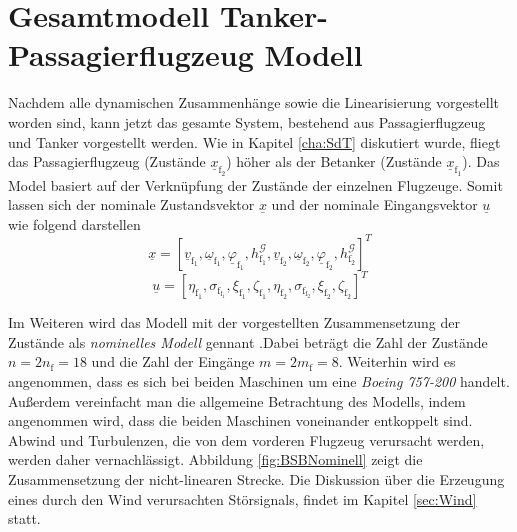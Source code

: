 \chapter{Gesamtmodell Tanker-Passagierflugzeug Modell}\label{cha:ZweiFlieger}
Nachdem alle dynamischen Zusammenhänge sowie die Linearisierung vorgestellt worden sind, kann jetzt das gesamte System, bestehend aus Passagierflugzeug und Tanker vorgestellt werden. Wie in Kapitel \ref{cha:SdT} diskutiert wurde, fliegt das Passagierflugzeug (Zustände $\underline{x}_\mathrm{f_2}$) höher als der Betanker (Zustände $\underline{x}_\mathrm{f_1}$). Das Model basiert auf der Verknüpfung der Zustände der einzelnen Flugzeuge. Somit lassen sich der nominale Zustandsvektor $\underline{x}$ und der nominale Eingangsvektor $\underline{u}$ wie folgend darstellen
\begin{equation}
\underline{x} = [
\underline{v}_\mathrm{f_1},\underline{\omega}_\mathrm{f_1},\underline{\varphi}_\mathrm{f_1},h^\mathcal{G}_\mathrm{f_1},
\underline{v}_\mathrm{f_2},\underline{\omega}_\mathrm{f_2},\underline{\varphi}_\mathrm{f_2},h^\mathcal{G}_\mathrm{f_2}]^T
\end{equation}
\begin{equation}
\underline{u} = [ \eta_\mathrm{f_1},\sigma_{\mathrm{f_{f_1}}}, \xi_\mathrm{f_1} , \zeta_\mathrm{f_1}, \eta_\mathrm{f_2},\sigma_{\mathrm{f_{f_2}}}, \xi_\mathrm{f_2} , \zeta_\mathrm{f_2}]^T
\end{equation}

Im Weiteren wird das Modell mit der vorgestellten Zusammensetzung der Zustände als \textit{nominelles Modell} gennant .Dabei beträgt die Zahl der Zustände $n = 2n_\mathrm{f} = 18$ und die Zahl der Eingänge $m = 2m_\mathrm{f} = 8$. Weiterhin wird es angenommen, dass es sich bei beiden Maschinen um eine \textit{Boeing 757-200} handelt. Au{\ss}erdem vereinfacht man die allgemeine Betrachtung des Modells, indem angenommen wird, dass die beiden Maschinen voneinander entkoppelt sind. Abwind und Turbulenzen, die von dem vorderen Flugzeug verursacht werden, werden daher vernachlässigt. Abbildung \ref{fig:BSBNominell} zeigt die Zusammensetzung der nicht-linearen Strecke. Die Diskussion über die Erzeugung eines durch den Wind verursachten Störsignals, findet im Kapitel \ref{sec:Wind} statt.


